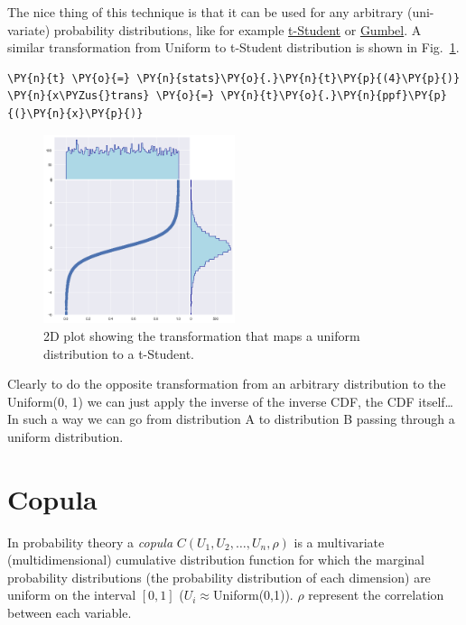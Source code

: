 The nice thing of this technique is that it can be used
for any arbitrary (uni-variate) probability distributions, like for
example \href{https://en.wikipedia.org/wiki/Student\%27s\_t-distribution}{t-Student}
or \href{https://en.wikipedia.org/wiki/Gumbel_distribution}{Gumbel}.
A similar transformation from Uniform to t-Student distribution is shown in Fig.~\ref{fig:uniform_to_tstudent}.

\begin{tcolorbox}[breakable, size=fbox, boxrule=1pt, pad at break*=1mm,colback=cellbackground, colframe=cellborder]
\begin{Verbatim}[commandchars=\\\{\}]
\PY{n}{t} \PY{o}{=} \PY{n}{stats}\PY{o}{.}\PY{n}{t}\PY{p}{(4}\PY{p}{)} 
\PY{n}{x\PYZus{}trans} \PY{o}{=} \PY{n}{t}\PY{o}{.}\PY{n}{ppf}\PY{p}{(}\PY{n}{x}\PY{p}{)}
\end{Verbatim}
\end{tcolorbox}

\begin{figure}[htbp]
  \centering
  \includegraphics[width=0.5\textwidth]{copula_files/copula_11_0.png}
  \caption{2D plot showing the transformation that maps a uniform distribution to a t-Student.}
  \label{fig:uniform_to_tstudent}
\end{figure}

    Clearly to do the opposite transformation from an arbitrary distribution
to the Uniform(0, 1) we can just apply the inverse of the inverse CDF,
the CDF itself\ldots
In such a way we can go from distribution A to distribution B passing through 
a uniform distribution.

\section{Copula}\label{copula}

In probability theory a \emph{copula} \(C(U_1, U_2, \ldots, U_n, \rho)\)
is a multivariate (multidimensional) cumulative distribution function
for which the marginal probability distributions (the probability
distribution of each dimension) are uniform on the
interval \([0, 1]\) (\(U_i \approx\)Uniform(0,1)).
\(\rho\) represent the correlation between each variable.

